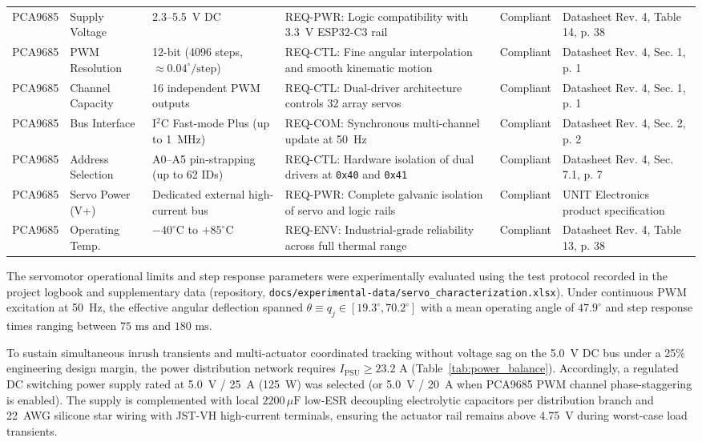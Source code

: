 \documentclass[lettersize,journal]{IEEEtran}
\begin{document}
\begin{table}[!t]
\begin{tabular}{p{2.2cm} p{2.8cm} p{3.0cm} p{3.8cm} c p{3.4cm}}
			PCA9685 & Supply Voltage & 2.3--5.5~V DC & REQ-PWR: Logic compatibility with 3.3~V ESP32-C3 rail & Compliant & Datasheet Rev. 4, Table 14, p. 38 \\
			PCA9685 & PWM Resolution & 12-bit (4096 steps, $\approx 0.04^\circ/\text{step}$) & REQ-CTL: Fine angular interpolation and smooth kinematic motion & Compliant & Datasheet Rev. 4, Sec. 1, p. 1 \\
			PCA9685 & Channel Capacity & 16 independent PWM outputs & REQ-CTL: Dual-driver architecture controls 32 array servos & Compliant & Datasheet Rev. 4, Sec. 1, p. 1 \\
			PCA9685 & Bus Interface & I$^2$C Fast-mode Plus (up to 1~MHz) & REQ-COM: Synchronous multi-channel update at 50~Hz & Compliant & Datasheet Rev. 4, Sec. 2, p. 2 \\
			PCA9685 & Address Selection & A0--A5 pin-strapping (up to 62 IDs) & REQ-CTL: Hardware isolation of dual drivers at \texttt{0x40} and \texttt{0x41} & Compliant & Datasheet Rev. 4, Sec. 7.1, p. 7 \\
			PCA9685 & Servo Power (V+) & Dedicated external high-current bus & REQ-PWR: Complete galvanic isolation of servo and logic rails & Compliant & UNIT Electronics product specification \\
			PCA9685 & Operating Temp. & $-40^\circ\text{C}$ to $+85^\circ\text{C}$ & REQ-ENV: Industrial-grade reliability across full thermal range & Compliant & Datasheet Rev. 4, Table 13, p. 38 \\
			\bottomrule
		\end{tabular}
	\end{table}
	
	The servomotor operational limits and step response parameters were experimentally evaluated using the test protocol recorded in the project logbook and supplementary data (repository, \texttt{docs/experimental-data/servo\_characterization.xlsx}). Under continuous PWM excitation at 50~Hz, the effective angular deflection spanned $\theta \equiv q_j \in [19.3^\circ, 70.2^\circ]$ with a mean operating angle of $47.9^\circ$ and step response times ranging between $75\text{ ms}$ and $180\text{ ms}$.
	
	To sustain simultaneous inrush transients and multi-actuator coordinated tracking without voltage sag on the 5.0~V DC bus under a 25\% engineering design margin, the power distribution network requires $I_{\text{PSU}} \ge 23.2\text{ A}$ (Table~\ref{tab:power_balance}). Accordingly, a regulated DC switching power supply rated at 5.0~V / 25~A (125~W) was selected (or 5.0~V / 20~A when PCA9685 PWM channel phase-staggering is enabled). The supply is complemented with local $2200\,\mu\text{F}$ low-ESR decoupling electrolytic capacitors per distribution branch and 22~AWG silicone star wiring with JST-VH high-current terminals, ensuring the actuator rail remains above 4.75~V during worst-case load transients.
	
\end{document}
